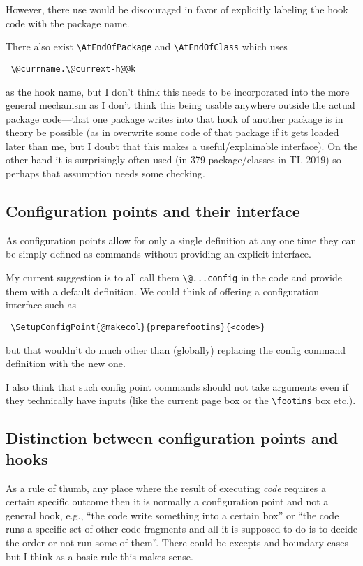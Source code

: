 \documentclass{article}
\newcounter{hook}
\newcounter{config}
\newcommand\cs[1]{\texttt{\textbackslash #1}}
\renewcommand\arg[1]{\textit{#1}}      %
\begin{document}
However, there use would be discouraged in favor of explicitly
labeling the hook code with the package name.

There also exist \cs{AtEndOfPackage} and \cs{AtEndOfClass} which uses
\begin{verbatim}
 \@currname.\@currext-h@@k
\end{verbatim}
as the hook name, but I don't think
this needs to be incorporated into the more general mechanism as I
don't think this being usable anywhere outside the actual package
code---that one package writes into that hook of another package is in
theory be possible (as in overwrite some code of that package if it
gets loaded later than me, but I doubt that this makes a
useful/explainable interface).  On the other hand it is surprisingly
often used (in 379 package/classes in TL 2019) so perhaps that
assumption needs some checking.


\subsection{Configuration points and their interface}

As configuration points allow for only a single definition at any one
time they can be simply defined as commands without providing an
explicit interface.

My current suggestion is to all call them \cs{@...config} in the
\LaTeXe{} code and provide them with a default definition. We could
think of offering a configuration interface such as
\begin{verbatim}
 \SetupConfigPoint{@makecol}{preparefootins}{<code>}
\end{verbatim}
but that wouldn't do much other than (globally) replacing the config
command definition with the new one.

I also think that such config point commands should not take arguments
even if they technically have inputs (like the current page box or the
\cs{footins} box etc.).



\subsection{Distinction between configuration points and hooks}

As a rule of thumb, any place where the result of executing \arg{code}
requires a certain specific outcome then it is normally a
configuration point and not a general hook, e.g., \enquote{the code
  write something into a certain box} or \enquote{the code runs a
  specific set of other code fragments and all it is supposed to do is
  to decide the order or not run some of them}.  There could be
excepts and boundary cases but I think as a basic rule this makes
sense.
\end{document}
